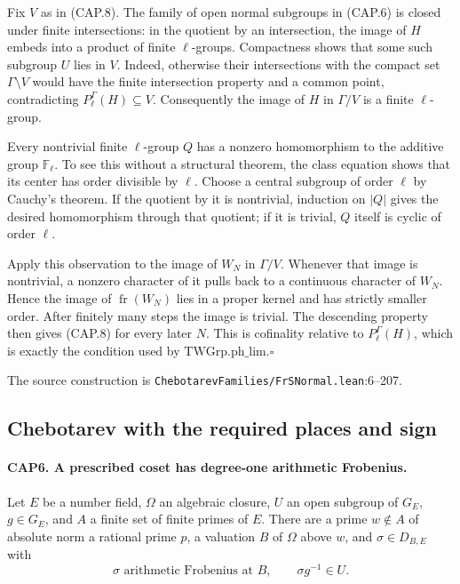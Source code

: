 Fix $V$ as in (CAP.8).  The family of open normal subgroups in (CAP.6)
is closed under finite intersections: in the quotient by an
intersection, the image of $H$ embeds into a product of finite
$\ell$-groups.  Compactness shows that some such subgroup $U$ lies
in $V$.  Indeed, otherwise their intersections with the compact set
$\Gamma\setminus V$ would have the finite intersection property and
a common point, contradicting $P_\ell^\Gamma(H)\subseteq V$.
Consequently the image of $H$ in $\Gamma/V$ is a finite $\ell$-group.

Every nontrivial finite $\ell$-group $Q$ has a nonzero homomorphism to
the additive group $\mathbb F_\ell$.  To see this without a structural
theorem, the class equation shows that its center has order divisible
by $\ell$.  Choose a central subgroup of order $\ell$ by Cauchy's
theorem.  If the quotient by it is nontrivial, induction on $|Q|$
gives the desired homomorphism through that quotient; if it is trivial,
$Q$ itself is cyclic of order $\ell$.

Apply this observation to the image of $W_N$ in $\Gamma/V$.  Whenever
that image is nontrivial, a nonzero character of it pulls back to a
continuous character of $W_N$.  Hence the image of
$\operatorname{fr}(W_N)$ lies in a proper kernel and has strictly
smaller order.  After finitely many steps the image is trivial.
The descending property then gives (CAP.8) for every later $N$.
This is cofinality relative to $P_\ell^\Gamma(H)$, which is exactly
the condition used by $\mathrm{TWGrp.ph\_lim}$.\hfill$\square$

The source construction is \nolinkurl{ChebotarevFamilies/FrSNormal.lean}:6--207.

\subsection{Chebotarev with the required places and sign}

\paragraph{CAP6. A prescribed coset has degree-one arithmetic Frobenius.}
\label{claim:CAP6}
Let $E$ be a number field, $\Omega$ an algebraic closure, $U$ an open
subgroup of $G_E$, $g\in G_E$, and $A$ a finite set of finite primes of
$E$.  There are a prime $w\notin A$ of absolute norm a rational prime
$p$, a valuation $B$ of $\Omega$ above $w$, and
$\sigma\in D_{B,E}$ with
\[
 \sigma\text{ arithmetic Frobenius at }B,\qquad
 \sigma g^{-1}\in U.
 \tag{CAP.9}
\]


